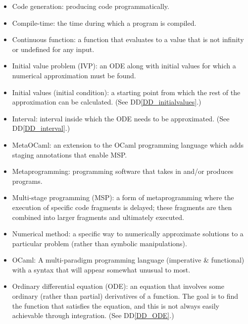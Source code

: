 \documentclass[12pt]{article}
\newcommand{\ddref}[1]{DD\ref{#1}}
\begin{document}
\begin{itemize}

\item Code generation: producing code programmatically.

\item Compile-time: the time during which a program is compiled.

\item Continuous function: a function that evaluates to a value that is not 
infinity or undefined for any input.

\item Initial value problem (IVP): an ODE along with initial values for which a 
numerical approximation must be found.

\item Initial values (initial condition): a starting point from which the rest 
of the approximation 
can be calculated. (See \ddref{DD_initialvalues}.)

\item Interval: interval inside which the ODE needs to be approximated. (See 
\ddref{DD_interval}.)

\item MetaOCaml: an extension to the OCaml programming language which adds 
staging annotations that enable MSP.

\item Metaprogramming: programming software that takes in and/or produces 
programs.

\item Multi-stage programming (MSP): a form of metaprogramming where the 
execution of specific code fragments is delayed; these fragments are then 
combined into larger fragments and ultimately executed.

\item Numerical method: a specific way to numerically approximate solutions to 
a particular problem (rather than symbolic manipulations).

\item OCaml: A multi-paradigm programming language (imperative \& functional) 
with a syntax that will appear somewhat unusual to most.

\item Ordinary differential equation (ODE): an equation that involves some 
ordinary (rather than partial) derivatives of a function. The goal is to find 
the function that satisfies the equation, and this is not always easily 
achievable through integration. (See \ddref{DD_ODE}.)


\end{itemize}
\end{document}
